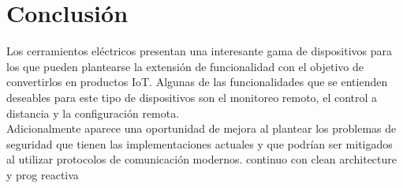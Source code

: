\section{Conclusión}
Los cerramientos eléctricos presentan una interesante gama de dispositivos para los que pueden plantearse la extensión de funcionalidad con el objetivo de convertirlos en productos IoT. Algunas de las funcionalidades que se entienden deseables para este tipo de dispositivos son el monitoreo remoto, el control a distancia y la configuración remota.\\
Adicionalmente aparece una oportunidad de mejora al plantear los problemas de seguridad que tienen las implementaciones actuales y que podrían ser mitigados al utilizar protocolos de comunicación modernos.
\asdasdasd continuo con clean architecture y prog reactiva

